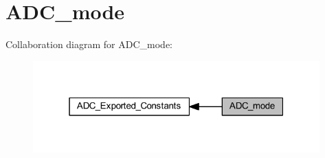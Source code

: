 \hypertarget{group___a_d_c__mode}{}\section{A\+D\+C\+\_\+mode}
\label{group___a_d_c__mode}
Collaboration diagram for A\+D\+C\+\_\+mode\+:
\nopagebreak
\begin{figure}[H]
\begin{center}
\leavevmode
\includegraphics[width=313pt]{group___a_d_c__mode}
\end{center}
\end{figure}
